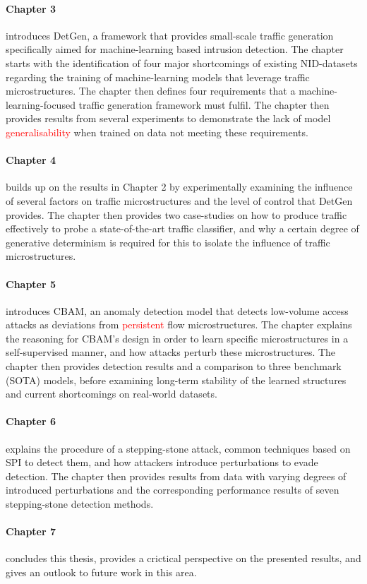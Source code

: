 \paragraph{Chapter 3} introduces DetGen, a framework that provides small-scale traffic generation specifically aimed for machine-learning based intrusion detection. The chapter starts with the identification of four major shortcomings of existing NID-datasets regarding the training of machine-learning models that leverage traffic microstructures. The chapter then defines four requirements that a machine-learning-focused traffic generation framework must fulfil. The chapter then provides results from several experiments to demonstrate the lack of model \textcolor{red}{generalisability} when trained on data not meeting these requirements. 

\paragraph{Chapter 4} builds up on the results in Chapter 2 by experimentally examining the influence of several factors on traffic microstructures and the level of control that DetGen provides. The chapter then provides two case-studies on how to produce traffic effectively to probe a state-of-the-art traffic classifier, and why a certain degree of generative determinism is required for this to isolate the influence of traffic microstructures. 

\paragraph{Chapter 5} introduces CBAM, an anomaly detection model that detects low-volume access attacks as deviations from \textcolor{red}{persistent} flow microstructures. The chapter explains the reasoning for CBAM's design in order to learn specific microstructures in a self-supervised manner, and how attacks perturb these microstructures. The chapter then provides detection results and a comparison to three benchmark (SOTA) models, before examining long-term stability of the learned structures and current shortcomings on real-world datasets.

\paragraph{Chapter 6} explains the procedure of a stepping-stone attack, common techniques based on SPI to detect them, and how attackers introduce perturbations to evade detection. The chapter then provides  results from data with varying degrees of introduced perturbations and the corresponding performance results of seven stepping-stone detection methods.

\paragraph{Chapter 7} concludes this thesis, provides a crictical perspective on the presented results, and gives an outlook to future work in this area.